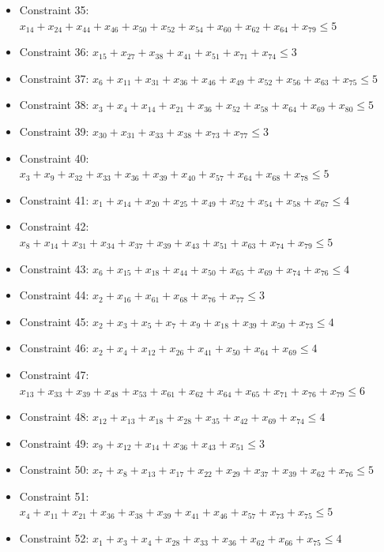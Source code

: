 \documentclass[11pt]{article}
\begin{document}
\begin{itemize}
\item Constraint 35: $x_{14} + x_{24} + x_{44} + x_{46} + x_{50} + x_{52} + x_{54} + x_{60} + x_{62} + x_{64} + x_{79} \le 5$
\item Constraint 36: $x_{15} + x_{27} + x_{38} + x_{41} + x_{51} + x_{71} + x_{74} \le 3$
\item Constraint 37: $x_{6} + x_{11} + x_{31} + x_{36} + x_{46} + x_{49} + x_{52} + x_{56} + x_{63} + x_{75} \le 5$
\item Constraint 38: $x_{3} + x_{4} + x_{14} + x_{21} + x_{36} + x_{52} + x_{58} + x_{64} + x_{69} + x_{80} \le 5$
\item Constraint 39: $x_{30} + x_{31} + x_{33} + x_{38} + x_{73} + x_{77} \le 3$
\item Constraint 40: $x_{3} + x_{9} + x_{32} + x_{33} + x_{36} + x_{39} + x_{40} + x_{57} + x_{64} + x_{68} + x_{78} \le 5$
\item Constraint 41: $x_{1} + x_{14} + x_{20} + x_{25} + x_{49} + x_{52} + x_{54} + x_{58} + x_{67} \le 4$
\item Constraint 42: $x_{8} + x_{14} + x_{31} + x_{34} + x_{37} + x_{39} + x_{43} + x_{51} + x_{63} + x_{74} + x_{79} \le 5$
\item Constraint 43: $x_{6} + x_{15} + x_{18} + x_{44} + x_{50} + x_{65} + x_{69} + x_{74} + x_{76} \le 4$
\item Constraint 44: $x_{2} + x_{16} + x_{61} + x_{68} + x_{76} + x_{77} \le 3$
\item Constraint 45: $x_{2} + x_{3} + x_{5} + x_{7} + x_{9} + x_{18} + x_{39} + x_{50} + x_{73} \le 4$
\item Constraint 46: $x_{2} + x_{4} + x_{12} + x_{26} + x_{41} + x_{50} + x_{64} + x_{69} \le 4$
\item Constraint 47: $x_{13} + x_{33} + x_{39} + x_{48} + x_{53} + x_{61} + x_{62} + x_{64} + x_{65} + x_{71} + x_{76} + x_{79} \le 6$
\item Constraint 48: $x_{12} + x_{13} + x_{18} + x_{28} + x_{35} + x_{42} + x_{69} + x_{74} \le 4$
\item Constraint 49: $x_{9} + x_{12} + x_{14} + x_{36} + x_{43} + x_{51} \le 3$
\item Constraint 50: $x_{7} + x_{8} + x_{13} + x_{17} + x_{22} + x_{29} + x_{37} + x_{39} + x_{62} + x_{76} \le 5$
\item Constraint 51: $x_{4} + x_{11} + x_{21} + x_{36} + x_{38} + x_{39} + x_{41} + x_{46} + x_{57} + x_{73} + x_{75} \le 5$
\item Constraint 52: $x_{1} + x_{3} + x_{4} + x_{28} + x_{33} + x_{36} + x_{62} + x_{66} + x_{75} \le 4$

\end{itemize}
\end{document}
